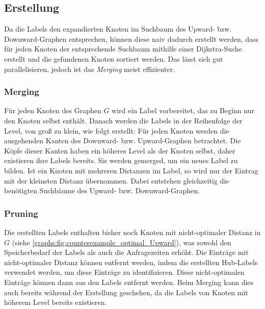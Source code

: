 \subsection{Erstellung}

Da die Labels den expandierten Knoten im Suchbaum des Upward- bzw. Downward-Graphen entsprechen, können diese naiv dadurch erstellt werden, dass für jeden Knoten der entsprechende Suchbaum mithilfe einer Dijkstra-Suche erstellt und die gefundenen Knoten sortiert werden.
Das lässt sich gut parallelisieren, jedoch ist das \emph{Merging} meist effizienter.

\subsubsection{Merging}

Für jeden Knoten des Graphen $G$ wird ein Label vorbereitet, das zu Beginn nur den Knoten selbst enthält.
Danach werden die Labels in der Reihenfolge der Level, von groß zu klein, wie folgt erstellt: Für jeden Knoten werden die ausgehenden Kanten des Downward- bzw. Upward-Graphen betrachtet.
Die Köpfe dieser Kanten haben ein höheres Level als der Knoten selbst, daher existieren ihre Labels bereits.
Sie werden gemerged, um ein neues Label zu bilden.
Ist ein Knoten mit mehreren Distanzen im Label, so wird nur der Eintrag mit der kleinsten Distanz übernommen.
Dabei entstehen gleichzeitig die benötigten Suchbäume des Upward- bzw. Downward-Graphen.


\subsubsection{Pruning}

Die erstellten Labels enthalten bisher noch Knoten mit nicht-optimaler Distanz in $G$ (siehe \autoref{graphs:fig:counterexample_optimal_Upward}), was sowohl den Speicherbedarf der Labels als auch die Anfragezeiten erhöht.
Die Einträge mit nicht-optimaler Distanz können entfernt werden, indem die erstellten Hub-Labels verwendet werden, um diese Einträge zu identifizieren.
Diese nicht-optimalen Einträge können dann aus den Labels entfernt werden.
Beim Merging kann dies auch bereits während der Erstellung geschehen, da die Labels von Knoten mit höherem Level bereits existieren.
